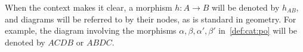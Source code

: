 \begin{notation}
    When the context makes it clear, a morphism \( h : A \to B \) will be denoted by \( h_{AB} \), and diagrams will be referred to by their nodes, as is standard in geometry. For example, the diagram involving the morphisms \( \alpha, \beta, \alpha', \beta' \) in~\autoref{def:cat:po} will be denoted by \( ACDB \) or \( ABDC \).
\end{notation}   